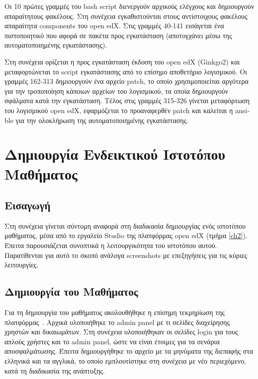 \documentclass[12pt]{report}
\begin{document}
Οι 10 πρώτες γραμμές του \textlatin{bash script} διενεργούν αρχικούς ελέγχους και δημιουργούν απαραίτητους φακέλους. Στη συνέχεια εγκαθιστούνται στους αντίστοιχους φακέλους απαραίτητα \textlatin{components} του \textlatin{open edX}. Στις γραμμές 40-141 εισάγεται ένα πιστοποιητικό που αφορά σε πακέτα προς εγκατάσταση (αποτυγχάνει μέσω της αυτοματοποιημένης εγκατάστασης).

Στη συνέχεια ορίζεται η προς εγκατάσταση έκδοση του \textlatin{open edX (Ginkgo2)} και μεταφορτώνεται το \textlatin{script} εγκατάστασης από το επίσημο αποθετήριο λογισμικού. Οι γραμμές 162-313 δημιουργούν ένα αρχείο \textlatin{patch}, το οποίο χρησιμοποιείται αργότερα για την τροποποίηση κάποιων αρχείων του λογισμικού, τα οποία δημιουργούν σφάλματα κατά την εγκατάσταση. Τέλος στις γραμμές 315-326 γίνεται μεταφόρτωση του λογισμικού \textlatin{open edX}, εφαρμόζεται το προαναφερθέν \textlatin{patch} και καλείται η \textlatin{ansible} για την ολοκλήρωση της αυτοματοποιημένης εγκατάστασης.

\chapter{Δημιουργία Ενδεικτικού Ιστοτόπου Μαθήματος}\label{ch4}
\section{Εισαγωγή}
Στη συνέχεια γίνεται σύντομη αναφορά στη διαδικασία δημιουργίας ενός ιστοτόπου μαθήματος, μέσα από το εργαλείο \textlatin{Studio} της πλατφόρμας \textlatin{open edX} (τμήμα \ref{ch2}). Έπειτα παρουσιάζεται συνοπτικά η λειτουργικότητα του ιστοτόπου αυτού. Παρατίθενται για αυτό το σκοπό ανάλογα \textlatin{screenshots} με επεξηγήσεις για τις κύριες λειτουργίες.

\section{Δημιουργία του Μαθήματος}
Για τη δημιουργία του μαθήματος ακολουθήθηκε η επίσημη τεκμηρίωση της πλατφόρμας~\cite{edxdata_package_1}. 
Αρχικά υλοποιήθηκε το \textlatin{admin panel} με τι σελίδες διαχείρησης χρηστών και δικαιωμάτων. Στη συνέχεια υλοποιήθηκαν οι σελίδες \textlatin{login} για τους απλούς χρήστες και το \textlatin{admin panel}, ώστε να είναι έτοιμες για τα σενάρια αποσφαλμάτωσης. Έπειτα δημιουργήθηκε το αρχείο με τα μηνύματα της διεπαφής στα ελληνικά και τα αγγλικά, το οποίο εμπλουτίστηκε στη συνέχεια με νέο περιεχόμενο, κατά τη διαδικασία της ανάπτυξης.
\end{document}
